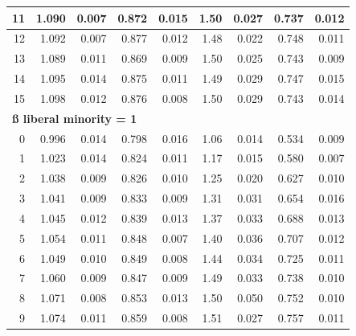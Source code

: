 \documentclass[
]{article}
\begin{document}
\begin{table}
\begin{tabular}[t]{r|r|r|r|r|r|r|r|r}
\hline
\hspace{1em}11 & 1.090 & 0.007 & 0.872 & 0.015 & 1.50 & 0.027 & 0.737 & 0.012\\
\hline
\hspace{1em}12 & 1.092 & 0.007 & 0.877 & 0.012 & 1.48 & 0.022 & 0.748 & 0.011\\
\hline
\hspace{1em}13 & 1.089 & 0.011 & 0.869 & 0.009 & 1.50 & 0.025 & 0.743 & 0.009\\
\hline
\hspace{1em}14 & 1.095 & 0.014 & 0.875 & 0.011 & 1.49 & 0.029 & 0.747 & 0.015\\
\hline
\hspace{1em}15 & 1.098 & 0.012 & 0.876 & 0.008 & 1.50 & 0.029 & 0.743 & 0.014\\
\hline
\multicolumn{9}{l}{\textbf{ß liberal minority = 1}}\\
\hline
\hspace{1em}0 & 0.996 & 0.014 & 0.798 & 0.016 & 1.06 & 0.014 & 0.534 & 0.009\\
\hline
\hspace{1em}1 & 1.023 & 0.014 & 0.824 & 0.011 & 1.17 & 0.015 & 0.580 & 0.007\\
\hline
\hspace{1em}2 & 1.038 & 0.009 & 0.826 & 0.010 & 1.25 & 0.020 & 0.627 & 0.010\\
\hline
\hspace{1em}3 & 1.041 & 0.009 & 0.833 & 0.009 & 1.31 & 0.031 & 0.654 & 0.016\\
\hline
\hspace{1em}4 & 1.045 & 0.012 & 0.839 & 0.013 & 1.37 & 0.033 & 0.688 & 0.013\\
\hline
\hspace{1em}5 & 1.054 & 0.011 & 0.848 & 0.007 & 1.40 & 0.036 & 0.707 & 0.012\\
\hline
\hspace{1em}6 & 1.049 & 0.010 & 0.849 & 0.008 & 1.44 & 0.034 & 0.725 & 0.011\\
\hline
\hspace{1em}7 & 1.060 & 0.009 & 0.847 & 0.009 & 1.49 & 0.033 & 0.738 & 0.010\\
\hline
\hspace{1em}8 & 1.071 & 0.008 & 0.853 & 0.013 & 1.50 & 0.050 & 0.752 & 0.010\\
\hline
\hspace{1em}9 & 1.074 & 0.011 & 0.859 & 0.008 & 1.51 & 0.027 & 0.757 & 0.011\\
\hline

\end{tabular}
\end{table}
\end{document}
